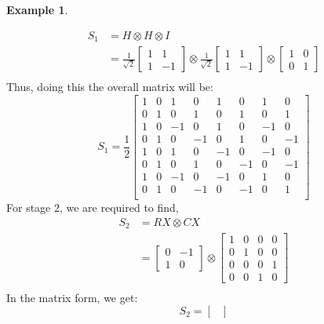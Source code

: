 \documentclass[12pt, oneside]{book}
\theoremstyle{definition}
\theoremstyle{definition}
\newtheorem{example}{Example}[section]
\theoremstyle{remark}
\begin{document}
\begin{example}
\begin{enumerate}
\begin{align*}
            S_1 &= H \otimes H \otimes I\\
            &= \frac{1}{\sqrt{2}}\begin{bmatrix} 1 & 1 \\ 1 & -1 \end{bmatrix} \otimes \frac{1}{\sqrt{2}}\begin{bmatrix} 1 & 1 \\ 1 & -1 \end{bmatrix} \otimes \begin{bmatrix} 1 & 0 \\ 0 & 1 \end{bmatrix}\\
        \end{align*}
        Thus, doing this the overall matrix will be:
        \[
            S_1 = \frac{1}{2}\begin{bmatrix}
                1 & 0 & 1 & 0 & 1 & 0 & 1 & 0 \\
                0 & 1 & 0 & 1 & 0 & 1 & 0 & 1 \\
                1 & 0 & -1 & 0 & 1 & 0 & -1 & 0 \\
                0 & 1 & 0 & -1 & 0 & 1 & 0 & -1 \\
                1 & 0 & 1 & 0 & -1 & 0 & -1 & 0 \\
                0 & 1 & 0 & 1 & 0 & -1 & 0 & -1 \\
                1 & 0 & -1 & 0 & -1 & 0 & 1 & 0 \\
                0 & 1 & 0 & -1 & 0 & -1 & 0 & 1 \\
            \end{bmatrix}
        \]
        For stage 2, we are required to find,
        \begin{align*}
            S_2 &= RX \otimes CX\\
            &= \begin{bmatrix} 0 & -1 \\ 1 & 0 \end{bmatrix} \otimes \begin{bmatrix} 1 & 0 & 0 & 0 \\
            0 & 1 & 0 & 0 \\
            0 & 0 & 0 & 1 \\
            0 & 0 & 1 & 0 \end{bmatrix} \\
        \end{align*}
        In the matrix form, we get:
        \[
            S_2=\begin{bmatrix}

\end{bmatrix}\]
\end{enumerate}
\end{example}
\end{document}
